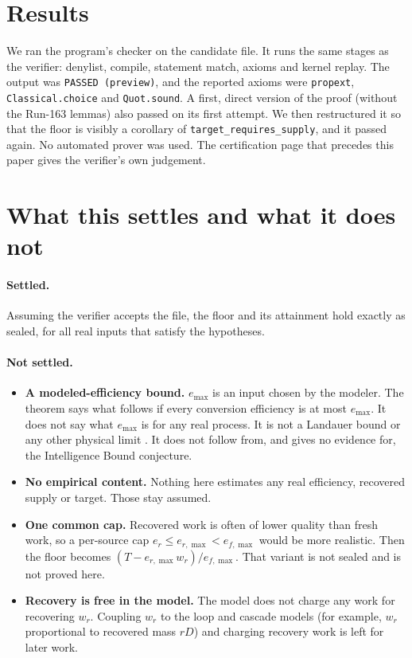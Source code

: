 \documentclass[11pt]{article}
\theoremstyle{definition}
\theoremstyle{remark}
\begin{document}
\section{Results}
\label{sec:results}
We ran the program's checker on the candidate file. It runs the same stages as the verifier:
denylist, compile, statement match, axioms and kernel replay. The output was
\texttt{PASSED (preview)}, and the reported axioms were \texttt{propext},
\texttt{Classical.choice} and \texttt{Quot.sound}. A first, direct version of the proof (without
the Run-163 lemmas) also passed on its first attempt. We then restructured it so that the floor is
visibly a corollary of \texttt{target\_requires\_supply}, and it passed again. No automated prover
was used. The certification page that precedes this paper gives the verifier's own judgement.

\section{What this settles and what it does not}
\label{sec:limits}
\paragraph{Settled.} Assuming the verifier accepts the file, the floor and its attainment hold
exactly as sealed, for all real inputs that satisfy the hypotheses.

\paragraph{Not settled.}
\begin{itemize}
\item \textbf{A modeled-efficiency bound.} $e_{\max}$ is an input chosen by the modeler. The theorem
says what follows if every conversion efficiency is at most $e_{\max}$. It does not say what
$e_{\max}$ is for any real process. It is not a Landauer bound or any other physical limit
\citep{landauer1961}. It does not follow from, and gives no evidence for, the Intelligence Bound
conjecture.
\item \textbf{No empirical content.} Nothing here estimates any real efficiency, recovered supply
or target. Those stay assumed.
\item \textbf{One common cap.} Recovered work is often of lower quality than fresh work, so a
per-source cap $e_r\le e_{r,\max}<e_{f,\max}$ would be more realistic. Then the floor becomes
$(T-e_{r,\max}w_r)/e_{f,\max}$. That variant is not sealed and is not proved here.
\item \textbf{Recovery is free in the model.} The model does not charge any work for recovering
$w_r$. Coupling $w_r$ to the loop and cascade models (for example, $w_r$ proportional to
recovered mass $rD$) and charging recovery work is left for later work.
\end{itemize}
\end{document}
